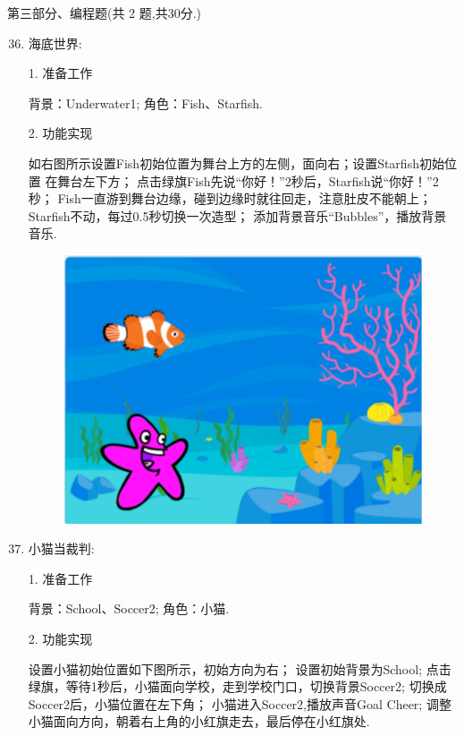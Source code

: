 \documentclass[10pt, a4paper]{article}
\begin{document}
    \newpage
    {\noindent\heiti 第三部分、编程题(共 2 题,共30分.)}
    \begin{enumerate}
        \setcounter{enumi}{35}
        
        \item 海底世界:
        
        1. 准备工作
        \begin{tasks}[label = (\arabic*)]
            \task 背景：Underwater1;
            \task 角色：Fish、Starfish.
        \end{tasks}
        2. 功能实现
        \begin{tasks}[label = (\arabic*)]
            \task 如右图所示设置Fish初始位置为舞台上方的左侧，面向右；设置Starfish初始位置 在舞台左下方；
            \task 点击绿旗Fish先说“你好！”2秒后，Starfish说“你好！”2秒；
            \task Fish一直游到舞台边缘，碰到边缘时就往回走，注意肚皮不能朝上；
            \task Starfish不动，每过0.5秒切换一次造型；
            \task 添加背景音乐“Bubbles”，播放背景音乐.
        \end{tasks}
        \begin{figure}[htbp]
            \centering
            \includegraphics[width=.2\textwidth]{36.png}
        \end{figure}
            
        \item 小猫当裁判:
        
        1. 准备工作
        \begin{tasks}[label = (\arabic*)]
            \task 背景：School、Soccer2;
            \task 角色：小猫.
        \end{tasks}
        2. 功能实现
        \begin{tasks}[label = (\arabic*)]
            \task 设置小猫初始位置如下图所示，初始方向为右；
            \task 设置初始背景为School;
            \task 点击绿旗，等待1秒后，小猫面向学校，走到学校门口，切换背景Soccer2;
            \task 切换成Soccer2后，小猫位置在左下角；
            \task 小猫进入Soccer2,播放声音Goal Cheer;
            \task 调整小猫面向方向，朝着右上角的小红旗走去，最后停在小红旗处.
        \end{tasks}


\end{enumerate}
\end{document}
